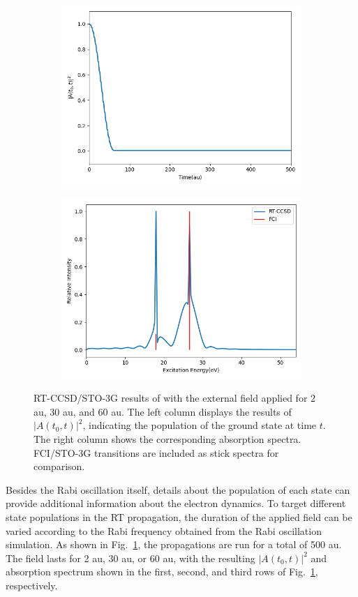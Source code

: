 \begin{figure}
\begin{subfigure}{0.47\textwidth}
         \includegraphics[width=\textwidth]{ch4/Figs/10-5.png}
     \end{subfigure}
     \hfill
     \begin{subfigure}{0.47\textwidth}
         \centering
         \includegraphics[width=\textwidth]{ch4/Figs/10-6.png}
     \end{subfigure}
     \caption{RT-CCSD/STO-3G results of  with the external field applied for 2 au, 30 au, and 60 au. The left column displays the results of $|A(t_{0}, t)|^{2}$, indicating the population of the ground state at time $t$. The right column shows the corresponding absorption spectra. FCI/STO-3G transitions are included as stick spectra for comparison.}
     \label{fig:h2-ge}
\end{figure}
Besides the Rabi oscillation itself, details about the population of each state can provide additional information about the electron dynamics. To target different state populations in the RT propagation, the duration of the applied field can be varied according to the Rabi frequency obtained from the Rabi oscillation simulation. As shown in Fig.~\ref{fig:h2-ge}, the propagations are run for a total of 500 au. The field lasts for 2 au, 30 au, or 60 au, with the resulting $|A(t_{0}, t)|^{2}$ and absorption spectrum shown in the first, second, and third rows of Fig.~\ref{fig:h2-ge}, respectively.

